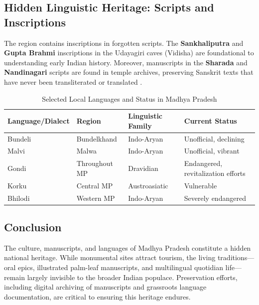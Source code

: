 \documentclass{article}
\begin{document}
\subsection{Hidden Linguistic Heritage: Scripts and Inscriptions}
The region contains inscriptions in forgotten scripts. The \textbf{Sankhaliputra} and \textbf{Gupta Brahmi} inscriptions in the Udayagiri caves (Vidisha) are foundational to understanding early Indian history. Moreover, manuscripts in the \textbf{Sharada} and \textbf{Nandinagari} scripts are found in temple archives, preserving Sanskrit texts that have never been transliterated or translated \cite{salomon1998}.

\begin{table}[h!]
\centering
\caption{Selected Local Languages and Status in Madhya Pradesh}
\label{tab:languages}
\begin{tabular}{|p{3.5cm}|p{3.5cm}|p{3.5cm}|p{3.5cm}|}
\hline
\textbf{Language/Dialect} & \textbf{Region} & \textbf{Linguistic Family} & \textbf{Current Status} \\
\hline
Bundeli & Bundelkhand & Indo-Aryan & Unofficial, declining \\
\hline
Malvi & Malwa & Indo-Aryan & Unofficial, vibrant \\
\hline
Gondi & Throughout MP & Dravidian & Endangered, revitalization efforts \\
\hline
Korku & Central MP & Austroasiatic & Vulnerable \\
\hline
Bhilodi & Western MP & Indo-Aryan & Severely endangered \\
\hline
\end{tabular}
\end{table}

\subsection*{Conclusion}
The culture, manuscripts, and languages of Madhya Pradesh constitute a hidden national heritage. While monumental sites attract tourism, the living traditions—oral epics, illustrated palm-leaf manuscripts, and multilingual quotidian life—remain largely invisible to the broader Indian populace. Preservation efforts, including digital archiving of manuscripts and grassroots language documentation, are critical to ensuring this heritage endures.
\end{document}
